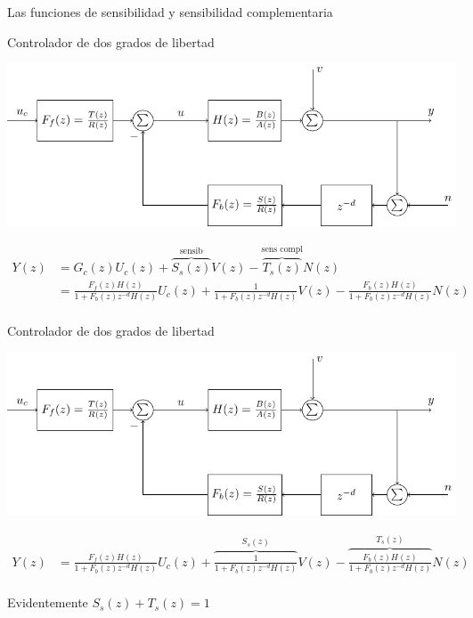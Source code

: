 \documentclass[presentation,aspectratio=169]{beamer}
\begin{document}
\begin{frame}[label={sec:org08d59c7}]{Las funciones de sensibilidad y sensibilidad complementaria}
\end{frame}
\begin{frame}[label={sec:orgb324b14}]{Controlador de dos grados de libertad}
\begin{center}
\includegraphics[width=0.8\linewidth]{../../figures/2dof-block-explicit}
\end{center}

\begin{align*}
Y(z) &= G_c(z)U_c(z) + \overbrace{S_s(z)}^{\text{sensib}}V(z) - \overbrace{T_s(z)}^{\text{sens compl}}N(z)\\
     &= \frac{F_f(z)H(z)}{1 + F_b(z)z^{-d}H(z)}U_c(z) + \frac{1}{1 + F_b(z)z^{-d}H(z)}V(z)  - \frac{F_b(z)H(z)}{1 + F_b(z)z^{-d}H(z)}N(z)\\
\end{align*}
\end{frame}

\begin{frame}[label={sec:org85d65fe}]{Controlador de dos grados de libertad}
\begin{center}
\includegraphics[width=0.7\linewidth]{../../figures/2dof-block-explicit}
\end{center}

\begin{align*}
Y(z)     &= \frac{F_f(z)H(z)}{1 + F_b(z)z^{-d}H(z)}U_c(z) + \overbrace{\frac{1}{1 + F_b(z)z^{-d}H(z)}}^{S_s(z)}V(z)  - \overbrace{\frac{F_b(z)H(z)}{1 + F_b(z)z^{-d}H(z)}}^{T_s(z)}N(z)\\
\end{align*}

\alert{Evidentemente} \(S_s(z) + T_s(z) = 1\)
\end{frame}
\end{document}

